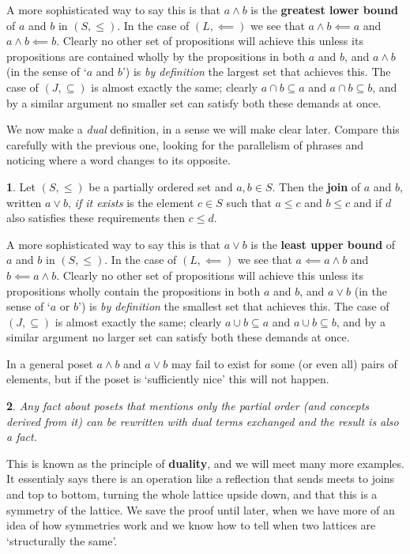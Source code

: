 \documentclass[oneside,english]{amsbook}
\numberwithin{section}{chapter}
\theoremstyle{plain}
\newtheorem{thm}{\protect\theoremname}
\theoremstyle{definition}
\newtheorem{defn}[thm]{\protect\definitionname}
\providecommand{\definitionname}{Definition}
\providecommand{\theoremname}{Theorem}
\begin{document}
A more sophisticated way to say this is that $a\land b$ is the \textbf{greatest lower bound }of $a$ and $b$ in $(S,\le)$. In the case of $(L,\impliedby)$ we see that $a\land b\impliedby a$ and $a\land b\impliedby b$. Clearly no other set of propositions will achieve this unless its propositions are contained wholly by the propositions in both $a$ and $b$, and $a\land b$ (in the sense of `$a$ and $b$') is \emph{by definition} the largest set that achieves this. The case of $(J,\subseteq)$ is almost exactly the same; clearly $a\cap b\subseteq a$ and $a\cap b\subseteq b$, and by a similar argument no smaller set can satisfy both these demands at once.

We now make a \emph{dual }definition, in a sense we will make clear later. Compare this carefully with the previous one, looking for the parallelism of phrases and noticing where a word changes to its opposite. 

\begin{defn} 
	Let $(S,\le)$ be a partially ordered set and $a,b\in S$. Then the \textbf{join} of $a$ and $b$, written $a\lor b$, \emph{if it exists} is the element $c\in S$ such that $a\le c$ and $b\le c$ and if $d$ also satisfies these requirements then $c\le d$. 
\end{defn} 

A more sophisticated way to say this is that $a\lor b$ is the \textbf{least upper bound }of $a$ and $b$ in $(S,\le)$. In the case of $(L,\impliedby)$ we see that $a\impliedby a\land b$ and $b\impliedby a\land b$. Clearly no other set of propositions will achieve this unless its propositions wholly contain the propositions in both $a$ and $b$, and $a\lor b$ (in the sense of `$a$ or $b$') is \emph{by definition} the smallest set that achieves this. The case of $(J,\subseteq)$ is almost exactly the same; clearly $a\cup b\subseteq a$ and $a\cup b\subseteq b$, and by a similar argument no larger set can satisfy both these demands at once.

In a general poset $a\land b$ and $a\lor b$ may fail to exist for some (or even all) pairs of elements, but if the poset is `sufficiently nice' this will not happen. 

\begin{thm} 
	Any fact about posets that mentions only the partial order (and concepts derived from it) can be rewritten with dual terms exchanged and the result is also a fact. 
\end{thm} 

This is known as the principle of \textbf{duality}, and we will meet many more examples. It essentialy says there is an operation like a reflection that sends meets to joins and top to bottom, turning the whole lattice upside down, and that this is a symmetry of the lattice. We save the proof until later, when we have more of an idea of how symmetries work and we know how to tell when two lattices are `structurally the same'. 
\end{document}
